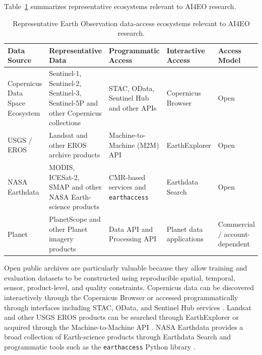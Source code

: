 \documentclass[11pt,a4paper]{article}
\begin{document}
Table~\ref{tab:eo-data-access} summarizes representative ecosystems
relevant to AI4EO research.

\begin{table}[htbp]
    \centering
    \small
    \begin{tabular}{
        p{}
        p{}
        p{}
        p{}
        p{}}
        \toprule
        \textbf{Data Source} &
        \textbf{Representative Data} &
        \textbf{Programmatic Access} &
        \textbf{Interactive Access} &
        \textbf{Access Model} \\
        \midrule

        Copernicus Data Space Ecosystem &
        Sentinel-1, Sentinel-2, Sentinel-3, Sentinel-5P and other Copernicus collections &
        STAC, OData, Sentinel Hub and other APIs &
        Copernicus Browser &
        Open \\

        USGS / EROS &
        Landsat and other EROS archive products &
        Machine-to-Machine (M2M) API &
        EarthExplorer &
        Open \\

        NASA Earthdata &
        MODIS, ICESat-2, SMAP and other NASA Earth-science products &
        CMR-based services and \texttt{earthaccess} &
        Earthdata Search &
        Open \\

        Planet &
        PlanetScope and other Planet imagery products &
        Data API and Processing API &
        Planet data applications &
        Commercial / account-dependent \\

        \bottomrule
    \end{tabular}
    \caption{Representative Earth Observation data-access ecosystems relevant to AI4EO research.}
    \label{tab:eo-data-access}
\end{table}

Open public archives are particularly valuable because they allow
training and evaluation datasets to be constructed using reproducible
spatial, temporal, sensor, product-level, and quality constraints.
Copernicus data can be discovered interactively through the Copernicus
Browser or accessed programmatically through interfaces including STAC,
OData, and Sentinel Hub services
\cite{cdse_documentation,cdse_apis,cdse_browser}. Landsat and other USGS
EROS products can be searched through EarthExplorer or acquired through
the Machine-to-Machine API \cite{usgs_m2m}. NASA Earthdata provides a
broad collection of Earth-science products through Earthdata Search and
programmatic tools such as the \texttt{earthaccess} Python library
\cite{nasa_earthdata_search,nasa_earthaccess}.
\end{document}
